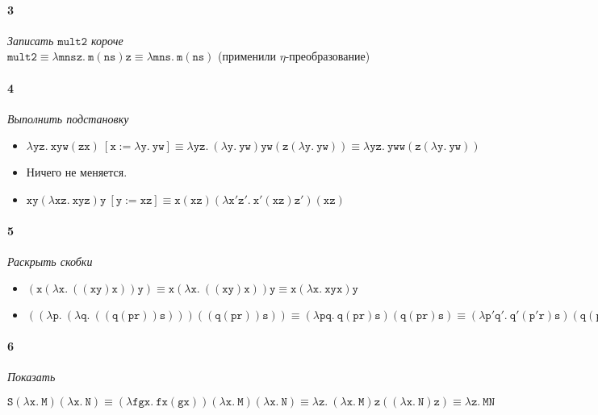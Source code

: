 \documentclass[russian]{article}
\begin{document}
\paragraph{3} \textit{Записать $\mathtt{mult2}$ короче}
\\

$\mathtt{mult2 \equiv \lambda mnsz.\ m(ns)z	\equiv \lambda mns.\ m(ns)}$ (применили $\eta$-преобразование)

\paragraph{4} \textit{Выполнить подстановку}

\begin{itemize}
\item $\mathtt{\lambda yz.\ xyw(zx)\ [x := \lambda y.\ yw]
	\equiv \lambda yz.\ (\lambda y.\ yw)yw(z(\lambda y.\ yw))
	\equiv \lambda yz.\ yww(z(\lambda y.\ yw)) }$

\item Ничего не меняется.

\item $\mathtt{xy(\lambda xz.\ xyz)y\ [y := xz]
	\equiv x(xz)(\lambda x'z'.\ x'(xz)z')(xz) }$

\end{itemize}

\paragraph{5} \textit{Раскрыть скобки}

\begin{itemize}
\item $\mathtt{
	(x(\lambda x.\ ((xy)x))y) \equiv
	x(\lambda x.\ ((xy)x))y \equiv
	x(\lambda x.\ xyx)y
	}$

\item $\mathtt{
	((\lambda p.\ (\lambda q.\ ((q (p r)) s))) ((q (p r)) s)) \equiv
	(\lambda pq.\ q (pr) s) (q (p r) s) \equiv
	(\lambda p'q'.\ q' (p'r) s) (q (p r) s) \equiv
	\lambda q'.\ q' (q (pr) sr) s
	}$
\end{itemize}

\paragraph{6} \textit{Показать}

$\mathtt{
	S(\lambda x.\ M)(\lambda x.\ N) \equiv
	(\lambda fgx.\ fx(gx))(\lambda x.\ M)(\lambda x.\ N) \equiv
	\lambda z.\ (\lambda x.\ M)z((\lambda x.\ N)z) \equiv
	\lambda z.\ MN}$
	
\end{document}

